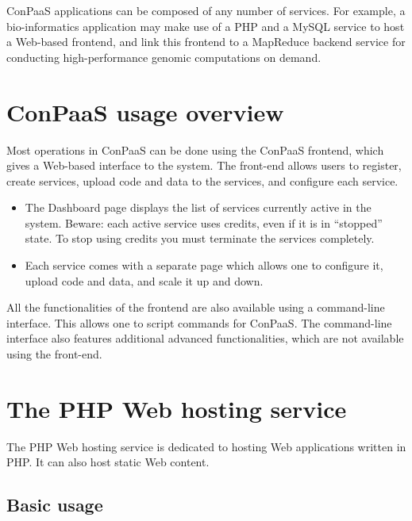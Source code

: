 \documentclass[10pt]{article}
\begin{document}
ConPaaS applications can be composed of any number of services. For
example, a bio-informatics application may make use of a PHP and a
MySQL service to host a Web-based frontend, and link this frontend to
a MapReduce backend service for conducting high-performance genomic
computations on demand.

\section{ConPaaS usage overview}

Most operations in ConPaaS can be done using the ConPaaS frontend,
which gives a Web-based interface to the system. The front-end allows
users to register, create services, upload code and data to the
services, and configure each service. 

\begin{itemize}
\item The Dashboard page displays the list of services currently
  active in the system. Beware: each active service uses credits, even
  if it is in ``stopped'' state. To stop using credits you must
  terminate the services completely.
\item Each service comes with a separate page which allows one to
  configure it, upload code and data, and scale it up and down.
\end{itemize}

All the functionalities of the frontend are also available using a
command-line interface. This allows one to script commands for
ConPaaS. The command-line interface also features additional advanced
functionalities, which are not available using the front-end.

\section{The PHP Web hosting service}

The PHP Web hosting service is dedicated to hosting Web applications
written in PHP. It can also host static Web content.

\subsection{Basic usage}
\end{document}
